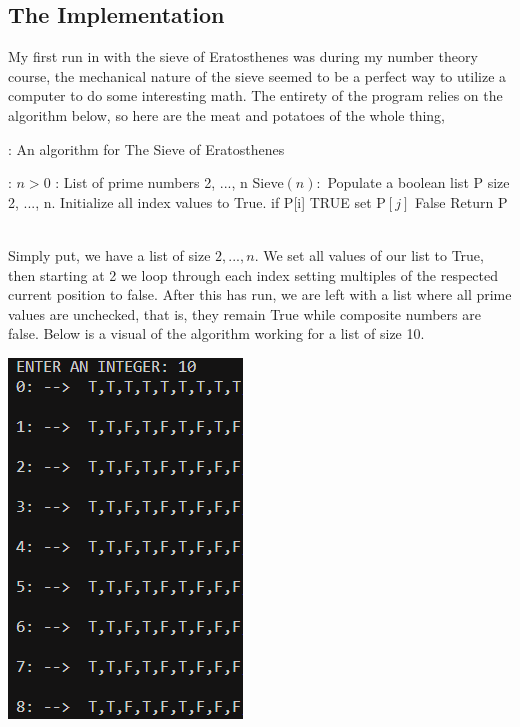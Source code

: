 \documentclass{article}
\begin{document}
\subsection{The Implementation}
My first run in with the sieve of Eratosthenes was during my number theory course, the 
mechanical nature of the sieve seemed to be a perfect way to utilize a computer to do
some interesting math. The entirety of the program relies on the algorithm below, so here 
are the meat and potatoes of the whole thing,
\begin{algorithm}
  \caption{: An algorithm for The Sieve of Eratosthenes}
  \begin{algorithmic}[1]
  \Require: $n > 0$
  \Ensure: List of prime numbers 2, ..., n
  \State Sieve$(n):$
      \State Populate a boolean list P size 2, ..., n.
      \State Initialize all index values to True.
          \State if P[i] TRUE
            \State set P$[j]$ False
          \EndFor
      \EndFor
    \State Return P
  \end{algorithmic}
\end{algorithm}\\
Simply put, we have a list of size $2,..., n$. We set all values of our list to True, then starting at 2 we loop through each index
setting multiples of the respected current position to false. After this has run, we are left with a list where all prime values are
unchecked, that is, they remain True while composite numbers are false. Below is a visual of the algorithm working for a list of size 10.
\begin{center}
  \includegraphics[scale=0.4]{Sieveiter.png}
\end{center}
\end{document}
